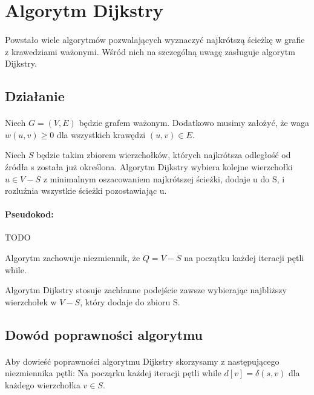 \section{Algorytm Dijkstry}

\label{sec:dijkstra}

\paragraph{}Powstało wiele algorytmów pozwalających wyznaczyć najkrótszą ścieżkę w grafie z
krawedziami ważonymi. Wśród nich na szczególną uwagę zasługuje algorytm Dijkstry.

\subsection{Działanie}

\paragraph{}Niech $G = (V, E)$ będzie grafem ważonym. Dodatkowo musimy założyć, że waga $w(u,v) \ge 0$
dla wszystkich krawędzi $(u, v) \in E$.

Niech $S$ będzie takim zbiorem wierzchołków, których najkrótsza odległość od źródła
s została już określona. Algorytm Dijkstry wybiera kolejne wierzchołki $u \in V - S$
z minimalnym oszacowaniem najkrótszej ścieżki, dodaje u do S, i rozluźnia wszystkie ścieżki pozostawiając u.

\paragraph{Pseudokod:}
TODO

Algorytm zachowuje niezmiennik, że $Q = V - S$ na początku każdej iteracji pętli while.

Algorytm Dijkstry stosuje zachłanne podejście zawsze wybierając najbliższy wierzchołek
w $V - S$, który dodaje do zbioru S.

\subsection{Dowód poprawności algorytmu}

\paragraph{}Aby dowieść poprawności algorytmu Dijkstry skorzysamy z następującego niezmiennika pętli:
Na począrku każdej iteracji pętli while $d[v] = \delta(s,v)$ dla każdego wierzchołka $v \in S$.

